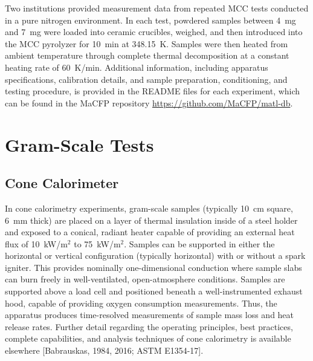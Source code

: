 \documentclass{book}
\begin{document}
Two institutions provided measurement data from repeated MCC tests conducted in a pure nitrogen environment. In each test, powdered samples between 4~mg and 7~mg were loaded into ceramic crucibles, weighed, and then introduced into the MCC pyrolyzer for 10~min at 348.15~K. Samples were then heated from ambient temperature through complete thermal decomposition at a constant heating rate of 60~K/min. Additional information, including  apparatus specifications, calibration details, and sample preparation, conditioning, and testing procedure, is provided in the README files for each experiment, which can be found in the MaCFP repository \href{https://github.com/MaCFP/matl-db}{https://github.com/MaCFP/matl-db}.

\section{Gram-Scale Tests}
\label{g_tests}

\subsection{Cone Calorimeter}

In cone calorimetry experiments, gram-scale samples (typically 10~cm square, 6~mm thick) are placed on a layer of thermal insulation inside of a steel holder and exposed to a conical, radiant heater capable of providing an external heat flux of 10~kW/m$^2$ to 75~kW/m$^2$. Samples can be supported in either the horizontal or vertical configuration (typically horizontal) with or without a spark igniter. This provides nominally one-dimensional conduction where sample slabs can burn freely in well-ventilated, open-atmosphere conditions. Samples are supported above a load cell and positioned beneath a well-instrumented exhaust hood, capable of providing oxygen consumption measurements. Thus, the apparatus produces time-resolved measurements of sample mass loss and heat release rates. Further detail regarding the operating principles, best practices, complete capabilities, and analysis techniques of cone calorimetry is available elsewhere [Babrauskas, 1984, 2016; ASTM E1354-17].
\end{document}
